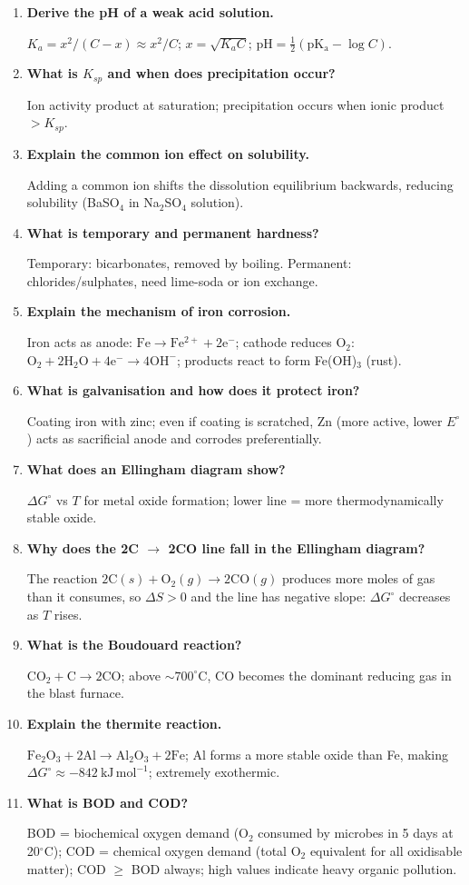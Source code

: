 \documentclass[12pt,a4paper]{article}
\newcommand{\Q}[1]{\textbf{#1}\par\noindent\ignorespaces}
\begin{document}
\begin{tcolorbox}[exambox, title={Frequently Asked / Viva Questions}]
\begin{enumerate}[topsep=0pt, label=\textbf{Q\arabic*.}, itemsep=5pt]
    $\mathrm{pH} = \mathrm{pK_a} + \log([\mathrm{A^-}]/[\mathrm{HA}])$; gives pH of a buffer; maximum capacity at $\mathrm{pH} = \mathrm{pK_a}$.
  \item \Q{Derive the pH of a weak acid solution.}
    $K_a = x^2/(C-x) \approx x^2/C$; $x = \sqrt{K_aC}$; $\mathrm{pH} = \tfrac12(\mathrm{pK_a} - \log C)$.
  \item \Q{What is $K_{sp}$ and when does precipitation occur?}
    Ion activity product at saturation; precipitation occurs when ionic product $> K_{sp}$.
  \item \Q{Explain the common ion effect on solubility.}
    Adding a common ion shifts the dissolution equilibrium backwards, reducing solubility (BaSO$_4$ in Na$_2$SO$_4$ solution).
  \item \Q{What is temporary and permanent hardness?}
    Temporary: bicarbonates, removed by boiling. Permanent: chlorides/sulphates, need lime-soda or ion exchange.
  \item \Q{Explain the mechanism of iron corrosion.}
    Iron acts as anode: $\mathrm{Fe \to Fe^{2+} + 2e^-}$; cathode reduces O$_2$: $\mathrm{O_2 + 2H_2O + 4e^- \to 4OH^-}$; products react to form Fe(OH)$_3$ (rust).
  \item \Q{What is galvanisation and how does it protect iron?}
    Coating iron with zinc; even if coating is scratched, Zn (more active, lower $E^\circ$) acts as sacrificial anode and corrodes preferentially.
  \item \Q{What does an Ellingham diagram show?}
    $\Delta G^\circ$ vs $T$ for metal oxide formation; lower line = more thermodynamically stable oxide.
  \item \Q{Why does the 2C $\to$ 2CO line fall in the Ellingham diagram?}
    The reaction $2\mathrm{C}(s) + \mathrm{O_2}(g) \to 2\mathrm{CO}(g)$ produces more moles of gas than it consumes, so $\Delta S > 0$ and the line has negative slope: $\Delta G^\circ$ decreases as $T$ rises.
  \item \Q{What is the Boudouard reaction?}
    $\mathrm{CO_2 + C \to 2CO}$; above $\sim 700^\circ$C, CO becomes the dominant reducing gas in the blast furnace.
  \item \Q{Explain the thermite reaction.}
    $\mathrm{Fe_2O_3 + 2Al \to Al_2O_3 + 2Fe}$; Al forms a more stable oxide than Fe, making $\Delta G^\circ \approx -842\ \mathrm{kJ\,mol^{-1}}$; extremely exothermic.
  \item \Q{What is BOD and COD?}
    BOD = biochemical oxygen demand (O$_2$ consumed by microbes in 5 days at 20$^\circ$C); COD = chemical oxygen demand (total O$_2$ equivalent for all oxidisable matter); COD $\geq$ BOD always; high values indicate heavy organic pollution.

\end{enumerate}
\end{tcolorbox}
\end{document}
